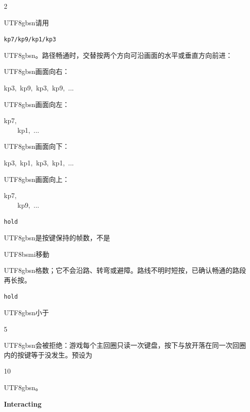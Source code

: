 \begin{paracol}{2}
\begin{CJK}{UTF8}{gbsn}请用\end{CJK} \texttt{kp7/kp9/kp1/kp3}\begin{CJK}{UTF8}{gbsn}。路径畅通时，交替按两个方向可沿画面的水平或垂直方向前进：\end{CJK}\par
{\ttfamily\scriptsize\raggedright\noindent \begin{CJK}{UTF8}{gbsn}画面向右：\end{CJK}kp3,\ kp9,\ kp3,\ kp9,\ ...\ \ \ \ \ \begin{CJK}{UTF8}{gbsn}画面向左：\end{CJK}kp7,\\\ \ \ \ kp1,\ ...\\\begin{CJK}{UTF8}{gbsn}画面向下：\end{CJK}kp3,\ kp1,\ kp3,\ kp1,\ ...\ \ \ \ \ \begin{CJK}{UTF8}{gbsn}画面向上：\end{CJK}kp7,\\\ \ \ \ kp9,\ ...\par}
\texttt{hold} \begin{CJK}{UTF8}{gbsn}是按键保持的帧数，不是\end{CJK}\begin{CJK}{UTF8}{bsmi}移動\end{CJK}\begin{CJK}{UTF8}{gbsn}格数；它不会沿路、转弯或避障。路线不明时短按，已确认畅通的路段再长按。\end{CJK}\texttt{hold} \begin{CJK}{UTF8}{gbsn}小于\end{CJK} 5 \begin{CJK}{UTF8}{gbsn}会被拒绝：游戏每个主回圈只读一次键盘，按下与放开落在同一次回圈内的按键等于没发生。预设为\end{CJK} 10\begin{CJK}{UTF8}{gbsn}。\end{CJK}\par
\switchcolumn*
\footnotesize\setlength{\parskip}{2pt}
{\footnotesize\bfseries Interacting\par}

\end{paracol}
